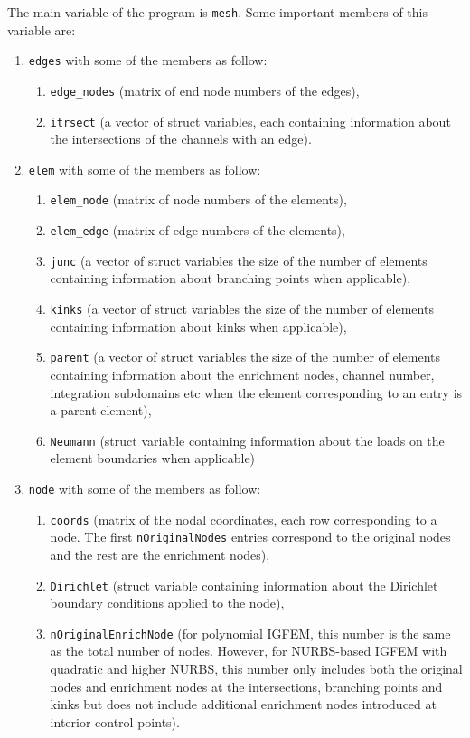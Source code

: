 \documentclass[11pt,letterpaper]{article}
\begin{document}
The main variable of the program is \texttt{mesh}. Some important members of this variable are:
\begin{enumerate}
\item \texttt{edges} with some of the members as follow:
		\begin{enumerate}%
				\item \texttt{edge\_nodes} (matrix of end node numbers of the edges),
				\item \texttt{itrsect} (a vector of struct variables, each containing information about the intersections of the channels with an edge).
		\end{enumerate}
\item \texttt{elem} with some of the members as follow:
		\begin{enumerate}
				\item \texttt{elem\_node} (matrix of node numbers of the elements),
				\item \texttt{elem\_edge} (matrix of edge numbers of the elements),
				\item \texttt{junc} (a vector of struct variables the size of the number of elements containing information about branching points when applicable),
				\item \texttt{kinks} (a vector of struct variables the size of the number of elements containing information about kinks when applicable),
				\item \texttt{parent} (a vector of struct variables the size of the number of elements containing information about the enrichment nodes, channel number, integration subdomains etc when the element corresponding to an entry is a parent element),
				\item \texttt{Neumann} (struct variable containing information about the loads on the element boundaries when applicable)
		\end{enumerate}
\item \texttt{node} with some of the members as follow:
		\begin{enumerate}
				\item \texttt{coords} (matrix of the nodal coordinates, each row corresponding to a node. The first \texttt{nOriginalNodes} entries correspond to the original nodes and the rest are the enrichment nodes),
				\item \texttt{Dirichlet} (struct variable containing information about the Dirichlet boundary conditions applied to the node),
				\item \texttt{nOriginalEnrichNode} (for polynomial IGFEM, this number is the same as the total number of nodes. However, for NURBS-based IGFEM with quadratic and higher NURBS, this number only includes both the original nodes and enrichment nodes at the intersections, branching points and kinks but does not include additional enrichment nodes introduced at interior control points).  
		\end{enumerate}
\end{enumerate} 
 
\end{document}
